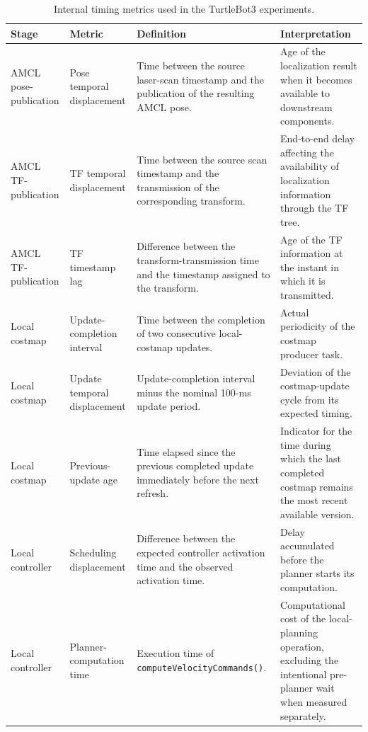 \begin{table}[t]
\centering
\caption{Internal timing metrics used in the TurtleBot3 experiments.}
\label{tab:turtlebot_internal_metrics}
\begin{tabular}{p{} p{}
                p{} p{}}
\hline
\textbf{Stage} &
\textbf{Metric} &
\textbf{Definition} &
\textbf{Interpretation} \\
\hline

AMCL pose-publication &
Pose temporal displacement &
Time between the source laser-scan timestamp and the publication of the resulting AMCL pose. &
Age of the localization result when it becomes available to downstream components. \\

AMCL TF-publication &
TF temporal displacement &
Time between the source scan timestamp and the transmission of the corresponding transform. &
End-to-end delay affecting the availability of localization information through the TF tree. \\

AMCL TF-publication &
TF timestamp lag &
Difference between the transform-transmission time and the timestamp assigned to the transform. &
Age of the TF information at the instant in which it is transmitted. \\

Local costmap &
Update-completion interval &
Time between the completion of two consecutive local-costmap updates. &
Actual periodicity of the costmap producer task. \\

Local costmap &
Update temporal displacement &
Update-completion interval minus the nominal 100-ms update period. &
Deviation of the costmap-update cycle from its expected timing. \\

Local costmap &
Previous-update age &
Time elapsed since the previous completed update immediately before the next refresh. &
Indicator for the time during which the last completed costmap remains the most recent available version. \\

Local controller &
Scheduling displacement &
Difference between the expected controller activation time and the observed activation time. &
Delay accumulated before the planner starts its computation. \\

Local controller &
Planner-computation time &
Execution time of \texttt{computeVelocityCommands()}. &
Computational cost of the local-planning operation, excluding the intentional pre-planner wait when measured separately. \\


\end{tabular}
\end{table}
